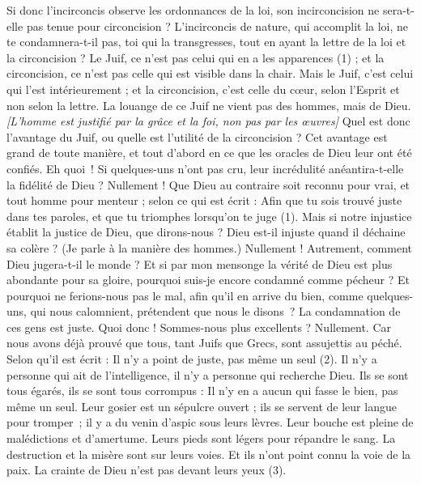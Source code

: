 \begin{multicols}{2}
Si donc l’incirconcis observe les ordonnances de la loi, son incirconcision ne sera-t-elle pas tenue pour circoncision ?
L’incirconcis de nature, qui accomplit la loi, ne te condamnera-t-il pas, toi qui la transgresses, tout en ayant la lettre de la loi et la circoncision ?
Le Juif, ce n’est pas celui qui en a les apparences (1) ; et la circoncision, ce n’est pas celle qui est visible dans la chair.
Mais le Juif, c’est celui qui l’est intérieurement ; et la circoncision, c’est celle du cœur, selon l’Esprit et non selon la lettre. La louange de ce Juif ne vient pas des hommes, mais de Dieu.
\textit{[L'homme est justifié par la grâce et la foi, non pas par les œuvres]}
\VerseOne{}Quel est donc l'avantage du Juif, ou quelle est l’utilité de la circoncision ?
Cet avantage est grand de toute manière, et tout d’abord en ce que les oracles de Dieu leur ont été confiés.
Eh quoi ! Si quelques-uns n'ont pas cru, leur incrédulité anéantira-t-elle la fidélité de Dieu ?
Nullement ! Que Dieu au contraire soit reconnu pour vrai, et tout homme pour menteur ; selon ce qui est écrit : Afin que tu sois trouvé juste dans tes paroles, et que tu triomphes lorsqu’on te juge (1).
Mais si notre injustice établit la justice de Dieu, que dirons-nous ? Dieu est-il injuste quand il déchaine sa colère ? (Je parle à la manière des hommes.)
Nullement ! Autrement, comment Dieu jugera-t-il le monde ?
Et si par mon mensonge la vérité de Dieu est plus abondante pour sa gloire, pourquoi suis-je encore condamné comme pécheur ?
Et pourquoi ne ferions-nous pas le mal, afin qu'il en arrive du bien, comme quelques-uns, qui nous calomnient, prétendent que nous le disons ? La condamnation de ces gens est juste.
Quoi donc ! Sommes-nous plus excellents ? Nullement. Car nous avons déjà prouvé que tous, tant Juifs que Grecs, sont assujettis au péché.
Selon qu'il est écrit : Il n'y a point de juste, pas même un seul (2).
Il n'y a personne qui ait de l'intelligence, il n'y a personne qui recherche Dieu.
Ils se sont tous égarés, ils se sont tous corrompus : Il n'y en a aucun qui fasse le bien, pas même un seul.
Leur gosier est un sépulcre ouvert ; ils se servent de leur langue pour tromper ; il y a du venin d'aspic sous leurs lèvres.
Leur bouche est pleine de malédictions et d'amertume.
Leurs pieds sont légers pour répandre le sang.
La destruction et la misère sont sur leurs voies.
Et ils n'ont point connu la voie de la paix.
La crainte de Dieu n'est pas devant leurs yeux (3).

\end{multicols}
